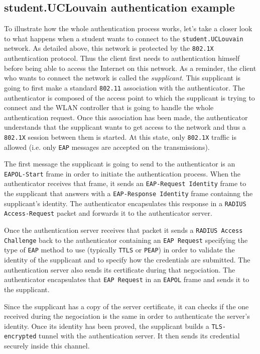 \subsection{student.UCLouvain authentication example}
To illustrate how the whole authentication process works, let's take a closer look to what happens when a student wants to connect to the \texttt{student.UCLouvain} network.
As detailed above, this network is protected by the \texttt{802.1X} authentication protocol. Thus the client first needs to authentication himself before being able to access the Internet on this network.
As a reminder, the client who wants to connect the network is called the \textit{supplicant}. This supplicant is going to first make a standard \texttt{802.11} association with the authenticator. The authenticator is composed of the access point to which the supplicant is trying to connect and the WLAN controller that is going to handle the whole authentication request. Once this association has been made, the authenticator understands that the supplicant wants to get access to the network and thus a \texttt{802.1X} session between them is started. At this state, only \texttt{802.1X} traffic is allowed (i.e. only \texttt{EAP} messages are accepted on the transmissions).

The first message the supplicant is going to send to the authenticator is an \texttt{EAPOL-Start} frame in order to initiate the authentication process. When the authenticator receives that frame, it sends an \texttt{EAP-Request Identity} frame to the supplicant that answers with a \texttt{EAP-Response Identity} frame containng the supplicant's identity. The authenticator encapsulates this response in a \texttt{RADIUS Access-Request} packet and forwards it to the authenticator server.

Once the authentication server receives that packet it sends a \texttt{RADIUS Access Challenge} back to the authenticator containing an \texttt{EAP Request} specifying the type of \texttt{EAP} method to use (typically \texttt{TTLS} or \texttt{PEAP}) in order to validate the identity of the supplicant and to specify how the credentials are submitted. The authentication server also sends its certificate during that negociation. The authenticator encapsulates that \texttt{EAP Request} in an \texttt{EAPOL} frame and sends it to the supplicant.

Since the supplicant has a copy of the server certificate, it can checks if the one received during the negociation is the same in order to authenticate the server's identity. Once its identity has been proved, the supplicant builds a \texttt{TLS-encrypted} tunnel with the authentication server. It then sends its credential securely inside this channel.

